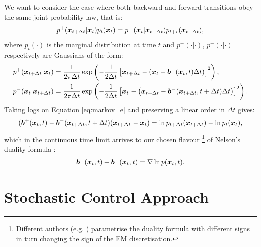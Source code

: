 \documentclass[a4paper,12pt,twoside,openright]{report}
\theoremstyle{definition}
\begin{document}
We want to consider the case where both backward and forward transitions obey the same joint probability law, that is:
\begin{align}\label{eq:markov_e}
    p^{+}({\bm{x}}_{t+\Delta t}|{\bm{x}}_t)p_t({\bm{x}}_t)=p^{-}({\bm{x}}_t|{\bm{x}}_{t+\Delta t})p_{t+\epsilon}({\bm{x}}_{t+\Delta t}),
\end{align}
where $p_t(\cdot)$ is the marginal distribution at time $t$ and $p^{+}(\cdot|\cdot)$,  $p^{-}(\cdot|\cdot)$ respectively are Gaussians of the form:
\begin{align*}
p^{+}({\bm{x}}_{t+\Delta t}|{\bm{x}}_t)&=\frac{1}{2\pi \Delta t }\exp\left(-\frac{1}{2\Delta t}\left[{\bm{x}}_{t+\Delta t}-({\bm{x}}_t+{\bm{b}}^{+}({\bm{x}}_t,t)\Delta t)\right]^2\right), \\
p^{-}({\bm{x}}_t|{\bm{x}}_{t+\Delta t})&=\frac{1}{2\pi \Delta t}\exp\left(-\frac{1}{2\Delta t}\left[{\bm{x}}_t-\left({\bm{x}}_{t+\Delta t}-{\bm{b}}^{-}({\bm{x}}_{t+\Delta t},t+\Delta t)\Delta t\right)\right]^2\right).
\end{align*}
Taking logs on Equation \ref{eq:markov_e} and preserving a linear order in $\Delta t$ gives:
\begin{align*}
    ({\bm{b}}^+({\bm{x}}_t,t)-{\bm{b}}^-({\bm{x}}_{t+\Delta t},t+\Delta t)({\bm{x}}_{t+\Delta t}-{\bm{x}}_t)=\operatorname{ln} p_{t+\Delta t}({\bm{x}}_{t+\Delta t}) - \operatorname{ln} p_t({\bm{x}}_t), 
\end{align*}
which in the continuous time limit arrives to our chosen flavour \footnote{Different authors (e.g. \cite{nagasawa2012stochastic}) parametrise the duality formula with different signs in turn changing the sign of the EM discretisation.} of Nelson's duality formula \citep{nelson1967dynamical}:
\begin{align*}
      {\bm{b}}^+({\bm{x}}_t,t) -{\bm{b}}^-({\bm{x}}_t,t) = \nabla\operatorname{ln} p({\bm{x}}_t, t).
\end{align*}

\section{Stochastic Control Approach}
\end{document}
